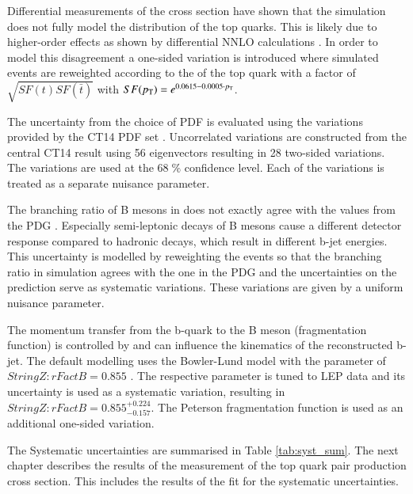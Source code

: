Differential measurements of the \ttbar cross section \cite{CMS-PAS-TOP-16-011} have shown that the simulation does not fully model the \pt distribution of the top quarks.
This is likely due to higher-order effects as shown by differential NNLO calculations \cite{PhysRevLett.116.082003}. In order to model this disagreement a one-sided variation is introduced where simulated events are reweighted according to the \pt of the top quark with a factor of $\sqrt{SF(t)SF(\bar{t})}$ with $SF(p_{\mathrm{T}})=e^{0.0615-0.0005\cdot p_{\mathrm{T}}}$.

The uncertainty from the choice of PDF is evaluated using the variations provided by the CT14 PDF set \cite{Dulat:2015mca}. Uncorrelated variations are constructed from the central CT14 result using 56 eigenvectors resulting in 28 two-sided variations.
The variations are used at the $68 \;\%$ confidence level. Each of the variations is treated as a separate nuisance parameter.


The branching ratio of B mesons in \PYTHIA does not exactly agree with the values from the PDG  \cite{Olive:2016xmw}. Especially semi-leptonic decays of B mesons cause a different detector response compared to  hadronic decays,
which result in different b-jet energies.
This uncertainty is modelled by reweighting the events so that the branching ratio in simulation agrees with the one in the PDG and the uncertainties on the prediction serve as systematic
variations. These variations are given by a uniform nuisance parameter.

The momentum transfer from the b-quark to the B meson (fragmentation function) is controlled by \PYTHIA and can influence the kinematics of the reconstructed b-jet. 
The default modelling uses the Bowler-Lund model \cite{Bowler1981} with the parameter of $StringZ:rFactB = 0.855$ \cite{Skands:2014pea,CMS-PAS-TOP-16-021}.
The respective parameter is tuned to LEP data and its uncertainty is used as a systematic variation, resulting in $StringZ:rFactB = 0.855^{+0.224}_{-0.157}$.
The Peterson fragmentation function \cite{PhysRevD.27.105} is used as an additional one-sided variation. 

The Systematic uncertainties are summarised in Table \ref{tab:syst_sum}.
The next chapter describes the results of the measurement of the top quark pair production cross section.
This includes the results of the fit for the systematic uncertainties.



